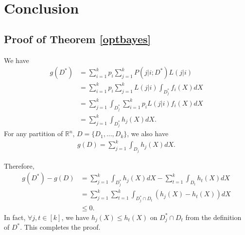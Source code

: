 \documentclass[english]{article}
\newenvironment{eqt}{\begin{equation}\begin{aligned}}{\end{aligned}\end{equation}}
\begin{document}
\section{Conclusion}





\newpage
\begin{appendix}
\section{Proof of Theorem \ref{optbayes}}
\paragraph{}

We have
\begin{eqt}
g(D^*) & = \sum_{i=1}^kp_i\sum_{j=1}^kP(j|i;D^*)L(j|i) \\
& = \sum_{i=1}^kp_i\sum_{j=1}^kL(j|i)\int_{D_j^*}f_i(X)dX \\
& = \sum_{j=1}^k\int_{D_j^*}\sum_{i=1}^kp_iL(j|i)f_i(X)dX \\
& = \sum_{j=1}^k\int_{D_j^*}h_j(X)dX.
\end{eqt}
For any partition of $\mathbb{R}^n$, $D = \{D_1, ..., D_k\}$, we also have
\begin{eqt}
g(D) = \sum_{j=1}^k\int_{D_j}h_j(X)dX.
\end{eqt}

Therefore, 
\begin{eqt}
g(D^*) - g(D) & = \sum_{j=1}^k\int_{D_j^*}h_j(X)dX - \sum_{t=1}^k\int_{D_t}h_t(X)dX \\
& = \sum_{j=1}^k\sum_{t=1}^k\int_{D_j^*\cap D_t}\left(h_j(X)-h_t(X)\right)dX \\
& \leqslant 0.
\end{eqt}
In fact, $\forall j, t\in[k]$, we have $h_j(X)\leqslant h_t(X)$ on $D_j^*\cap D_t$ from the definition of $D^*$. This completes the proof.
\end{appendix}
\end{document}
